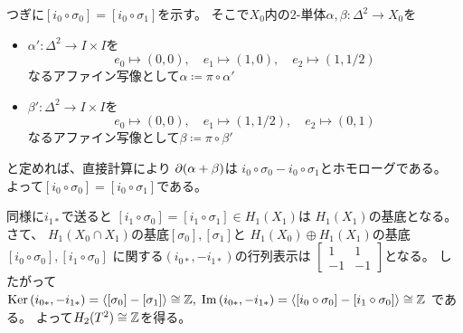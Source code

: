 \documentclass[report]{jlreq}
\begin{document}
\begin{answer}
\begin{innerproof}
        つぎに$[i_0 \circ \sigma_0] = [i_0 \circ \sigma_1]$を示す。
        そこで$X_0$内の$2$-単体$\alpha, \beta \colon \Delta^2 \to X_0$を
        \begin{itemize}[label=\bullet]
            \item $\alpha' \colon \Delta^2 \to I \times I$を
                \begin{equation}
                    e_0 \mapsto (0, 0), \quad
                    e_1 \mapsto (1, 0), \quad
                    e_2 \mapsto (1, 1/2)
                \end{equation}
                なるアファイン写像として$\alpha \coloneqq \pi \circ \alpha'$
            \item $\beta' \colon \Delta^2 \to I \times I$を
                \begin{equation}
                    e_0 \mapsto (0, 0), \quad
                    e_1 \mapsto (1, 1/2), \quad
                    e_2 \mapsto (0, 1)
                \end{equation}
                なるアファイン写像として$\beta \coloneqq \pi \circ \beta'$
        \end{itemize}
        と定めれば、直接計算により
        $\partial(\alpha + \beta)$は
        $i_0 \circ \sigma_0 - i_0 \circ \sigma_1$とホモローグである。
        よって$[i_0 \circ \sigma_0] = [i_0 \circ \sigma_1]$である。
    \end{innerproof}
    同様に$i_{1*}$で送ると
    $[i_1 \circ \sigma_0] = [i_1 \circ \sigma_1] \in H_1(X_1)$は
    $H_1(X_1)$の基底となる。
    さて、
    $H_1(X_0 \cap X_1)$の基底$[\sigma_0], [\sigma_1]$と
    $H_1(X_0) \oplus H_1(X_1)$の基底$[i_0 \circ \sigma_0], [i_1 \circ \sigma_0]$
    に関する$(i_{0*}, -i_{1*})$の行列表示は
    $\begin{bmatrix}
        1 & 1 \\
        -1 & -1
    \end{bmatrix}$となる。
    したがって
    $\operatorname{\mathrm{Ker}} \, (i_{0*}, -i_{1*})
        = \langle [\sigma_0] - [\sigma_1] \rangle
        \cong \mathbb{Z}, \;
    \operatorname{\mathrm{Im}} \, (i_{0*}, -i_{1*})
        = \langle [i_0 \circ \sigma_0] - [i_1 \circ \sigma_0] \rangle
        \cong \mathbb{Z}$
    である。
    よって$H_2(T^2) \cong \mathbb{Z}$を得る。


\end{answer}
\end{document}
